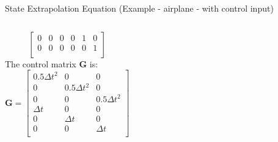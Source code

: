 \begin{frame}{State Extrapolation Equation (Example - airplane - with control input)}
\begin{columns}
$$\begin{bmatrix}
        0 & 0 & 0 & 0 & 1 & 0 \\
        0 & 0 & 0 & 0 & 0 & 1 \\
        \end{bmatrix}$$ 
        The control matrix $\mathbf{G}$ is:
        $$\mathbf{G} = \begin{bmatrix}
        0.5\Delta t^2 & 0 & 0 \\
        0 & 0.5\Delta t^2 & 0 \\
        0 & 0 & 0.5\Delta t^2 \\
        \Delta t & 0 & 0 \\
        0 & \Delta t & 0 \\
        0 & 0 & \Delta t \\
        \end{bmatrix}$$
        \end{columns}

\end{frame}
